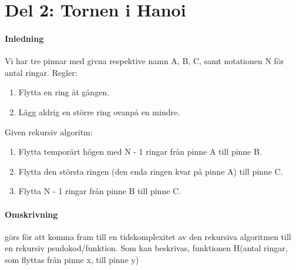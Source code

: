 \section{Del 2: Tornen i Hanoi}
\paragraph{Inledning}    
Vi har tre pinnar med givna respektive namn A, B, C, samt notationen N för antal ringar.
\newline
Regler:
\begin{enumerate}
\item Flytta en ring åt gången.
\item Lägg aldrig en större ring ovanpå en mindre.
\end{enumerate}

\vspace{5mm}
Given rekursiv algoritm:
\begin{enumerate}
	\item Flytta temporärt högen med N - 1 ringar från pinne A till pinne B.
	\item Flytta den största ringen (den enda ringen kvar på pinne A) till pinne C.
	\item Flytta N - 1 ringar från pinne B till pinne C.
\end{enumerate}

\paragraph{Omskrivning}

görs för att komma fram till en tidskomplexitet av den rekursiva algoritmen till
en rekursiv psudokod/funktion. Som kan beskrivas, funktionen H(antal ringar, som flyttas från
pinne x, till pinne y)

